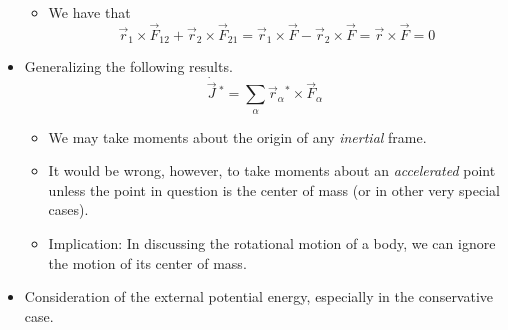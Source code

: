 \documentclass[../notes.tex]{subfiles}
\begin{document}
\begin{itemize}
\begin{itemize}
        \item We have that
        \begin{equation*}
            \vec{r}_1\times\vec{F}_{12}+\vec{r}_2\times\vec{F}_{21} = \vec{r}_1\times\vec{F}-\vec{r}_2\times\vec{F}
            = \vec{r}\times\vec{F}
            = 0
        \end{equation*}
    \end{itemize}
    \item Generalizing the following results.
    \begin{equation*}
        \dot{\vec{J}}{\,}^* = \sum_\alpha\vec{r}_\alpha{}^*\times\vec{F}_\alpha
    \end{equation*}
    \begin{itemize}
        \item We may take moments about the origin of any \emph{inertial} frame.
        \item It would be wrong, however, to take moments about an \emph{accelerated} point unless the point in question is the center of mass (or in other very special cases).
        \item Implication: In discussing the rotational motion of a body, we can ignore the motion of its center of mass.
    \end{itemize}
    \item Consideration of the external potential energy, especially in the conservative case.
\end{itemize}
\end{document}
